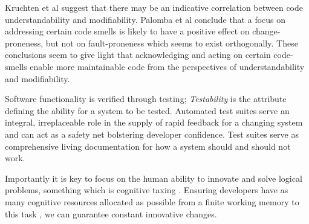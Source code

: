 Kruchten et al \parencite*{kruchten2012technical} suggest that there may be an indicative correlation between code understandability and modifiability. Palomba et al \parencite*{palomba2018diffuseness} conclude that a focus on addressing certain code smells \parencite[chapter~3]{fowler1999refactoring} is likely to have a positive effect on change-proneness, but not on fault-proneness which seems to exist orthogonally. These conclusions seem to give light that acknowledging and acting on certain code-smells enable more maintainable code from the perspectives of understandability and modifiability. 

Software functionality is verified through testing; \textit{Testability} is the attribute defining the ability for a system to be tested.  Automated test suites serve an integral, irreplaceable role in the supply of rapid feedback for a changing system and can act as a safety net bolstering developer confidence.  Test suites serve as comprehensive living documentation for how a system should and should not work. 

Importantly it is key to focus on the human ability to innovate and solve logical problems, something which is cognitive taxing \parencite{sweller1998cognitive}. Ensuring developers have as many cognitive resources allocated as possible from a finite working memory to this task \parencite{miyake1999models}, we can guarantee constant innovative changes. 